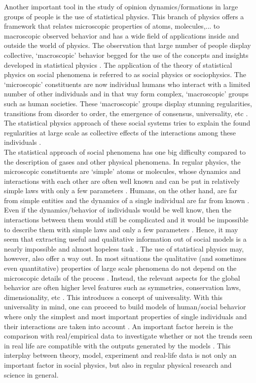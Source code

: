 \documentclass[11 pt , letterpaper , twoside , openright]{book}
\begin{document}
Another important tool in the study of opinion dynamics/formations in large groups of people is the use of statistical physics. This branch of physics offers a framework that relates microscopic properties of atoms, molecules,... to macroscopic observed behavior and has a wide field of applications inside and outside the world of physics. The observation that large number of people display collective, `macroscopic' behavior begged for the use of the concepts and insights developed in statistical physics \cite{Sirbu2016}. The application of the theory of statistical physics on social phenomena is referred to as social physics or sociophysics. The `microscopic' constituents are now individual humans who interact with a limited number of other individuals and in that way form complex, `macroscopic' groups such as human societies. These `macroscopic' groups display stunning regularities, transitions from disorder to order, the emergence of consensus, universality, etc \cite{Buchanan2007}. The statistical physics approach of these social systems tries to explain the found regularities at large scale as collective effects of the interactions among these individuals \cite{Sirbu2016}.\\
\newline
The statistical approach of social phenomena has one big difficulty compared to the description of gases and other physical phenomena. In regular physics, the microscopic constituents are `simple' atoms or molecules, whose dynamics and interactions with each other are often well known and can be put in relatively simple laws with only a few parameters \cite{Castellano2009}. Humans, on the other hand, are far from simple entities and the dynamics of a single individual are far from known \cite{Castellano2009}. Even if the dynamics/behavior of individuals would be well know, then the interactions between them would still be complicated and it would be impossible to describe them with simple laws and only a few parameters \cite{Castellano2009}. Hence, it may seem that extracting useful and qualitative information out of social models is a nearly impossible and almost hopeless task \cite{Castellano2009}. The use of statistical physics may, however, also offer a way out. In most situations the qualitative (and sometimes even quantitative) properties of large scale phenomena do not depend on the microscopic details of the process \cite{Castellano2009}. Instead, the relevant aspects for the global behavior are often higher level features such as symmetries, conservation laws, dimensionality, etc \cite{Castellano2009}. This introduces a concept of universality. With this universality in mind, one can proceed to build models of human/social behavior where only the simplest and most important properties of single individuals and their interactions are taken into account \cite{Castellano2009}. An important factor herein is the comparison with real/empirical data to investigate whether or not the trends seen in real life are compatible with the outputs generated by the models \cite{Castellano2009}. This interplay between theory, model, experiment and real-life data is not only an important factor in social physics, but also in regular physical research and science in general.
\end{document}

